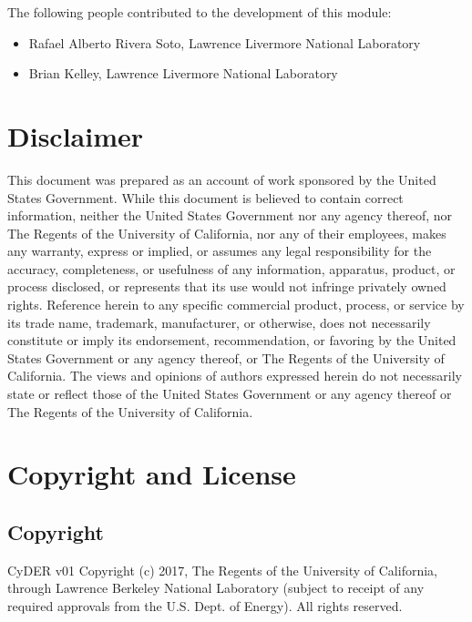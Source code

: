 \documentclass[letterpaper,10pt,english]{sphinxmanual}
\begin{document}
The following people contributed to the development of this module:
\begin{itemize}
\item {} 
Rafael Alberto Rivera Soto, Lawrence Livermore National Laboratory

\item {} 
Brian Kelley, Lawrence Livermore National Laboratory

\end{itemize}


\chapter{Disclaimer}
\label{\detokenize{disclaimer::doc}}\label{\detokenize{disclaimer:disclaimer}}
This document was prepared as an account of work sponsored by the United States
Government. While this document is believed to contain correct information, neither the
United States Government nor any agency thereof, nor The Regents of the University of
California, nor any of their employees, makes any warranty, express or implied, or assumes
any legal responsibility for the accuracy, completeness, or usefulness of any information,
apparatus, product, or process disclosed, or represents that its use would not infringe
privately owned rights. Reference herein to any specific commercial product, process, or
service by its trade name, trademark, manufacturer, or otherwise, does not necessarily
constitute or imply its endorsement, recommendation, or favoring by the United States
Government or any agency thereof, or The Regents of the University of California. The
views and opinions of authors expressed herein do not necessarily state or reflect those of the
United States Government or any agency thereof or The Regents of the University of
California.


\chapter{Copyright and License}
\label{\detokenize{legal:copyright-and-license}}\label{\detokenize{legal::doc}}

\section{Copyright}
\label{\detokenize{legal:copyright}}
\sphinxquotedblleft{}CyDER v01\sphinxquotedblright{} Copyright (c) 2017, The Regents of the University of California,
through Lawrence Berkeley National Laboratory (subject to receipt of any
required approvals from the U.S. Dept. of Energy).  All rights reserved.
\end{document}
